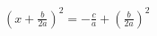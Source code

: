 \documentclass[preview]{standalone}
\begin{document}
\begin{center}
$\left( x + \frac{b}{2a} \right)^2 = - \frac{c}{a} + \left( \frac{b}{2a} \right)^2$
\end{center}
\end{document}
